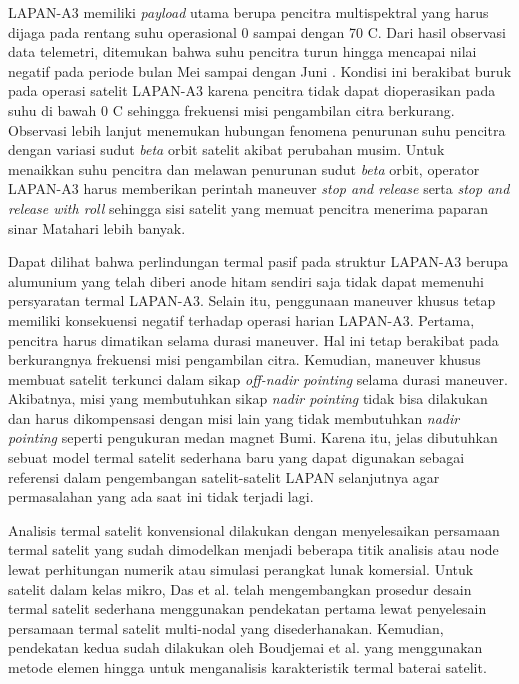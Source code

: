 LAPAN-A3 memiliki \textit{payload} utama berupa pencitra multispektral yang
harus dijaga pada rentang suhu operasional 0 sampai dengan 70 \degree C. Dari
hasil observasi data telemetri, ditemukan bahwa suhu pencitra turun hingga
mencapai nilai negatif pada periode bulan Mei sampai dengan Juni
\cite{ribah2019}. Kondisi ini berakibat buruk pada operasi satelit LAPAN-A3
karena pencitra tidak dapat dioperasikan pada suhu di bawah 0 \degree C
sehingga frekuensi misi pengambilan citra berkurang. Observasi lebih lanjut
menemukan hubungan fenomena penurunan suhu pencitra dengan variasi sudut
\textit{beta} orbit satelit akibat perubahan musim. Untuk menaikkan suhu
pencitra dan melawan penurunan sudut \textit{beta} orbit, operator LAPAN-A3
harus memberikan perintah maneuver \textit{stop and release} serta \textit{stop
and release with roll} sehingga sisi satelit yang memuat pencitra menerima
paparan sinar Matahari lebih banyak.

Dapat dilihat bahwa perlindungan termal pasif pada struktur LAPAN-A3 berupa
alumunium yang telah diberi anode hitam sendiri saja tidak dapat memenuhi
persyaratan termal LAPAN-A3. Selain itu, penggunaan maneuver khusus tetap
memiliki konsekuensi negatif terhadap operasi harian LAPAN-A3. Pertama,
pencitra harus dimatikan selama durasi maneuver. Hal ini tetap berakibat pada
berkurangnya frekuensi misi pengambilan citra. Kemudian, maneuver khusus
membuat satelit terkunci dalam sikap \textit{off-nadir pointing} selama durasi
maneuver. Akibatnya, misi yang membutuhkan sikap \textit{nadir pointing} tidak
bisa dilakukan dan harus dikompensasi dengan misi lain yang tidak membutuhkan
\textit{nadir pointing} seperti pengukuran medan magnet Bumi. Karena itu, jelas
dibutuhkan sebuat model termal satelit sederhana baru yang dapat digunakan
sebagai referensi dalam pengembangan satelit-satelit LAPAN selanjutnya agar
permasalahan yang ada saat ini tidak terjadi lagi.

Analisis termal satelit konvensional dilakukan dengan menyelesaikan persamaan
termal satelit yang sudah dimodelkan menjadi beberapa titik analisis atau node
lewat perhitungan numerik atau simulasi perangkat lunak komersial. Untuk
satelit dalam kelas mikro, Das et al. \cite{das} telah mengembangkan prosedur
desain termal satelit sederhana menggunakan pendekatan pertama lewat
penyelesain persamaan termal satelit multi-nodal yang disederhanakan. Kemudian,
pendekatan kedua sudah dilakukan oleh Boudjemai et al. \cite{boudjemai2015}
yang menggunakan metode elemen hingga untuk menganalisis karakteristik termal
baterai satelit.

